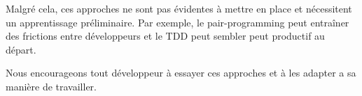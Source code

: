 \documentclass[journal, a4paper, frenchb]{IEEEtran}
\begin{document}
Malgré cela, ces approches ne sont pas évidentes à mettre en place et nécessitent un apprentissage préliminaire. Par exemple, le pair-programming peut entraîner des frictions entre développeurs et le TDD peut sembler peut productif au départ.

Nous encourageons tout développeur à essayer ces approches et à les adapter a sa manière de travailler.


\end{document}
